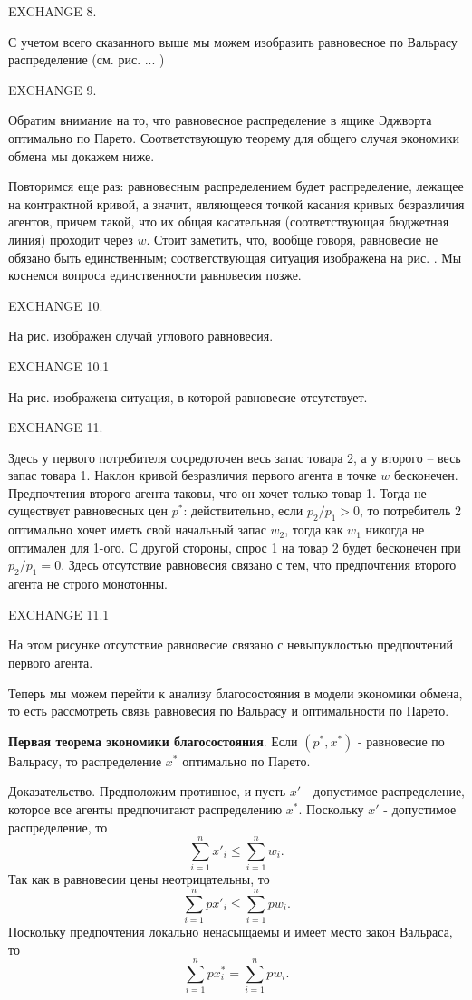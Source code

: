 EXCHANGE 8.

С учетом всего сказанного выше мы можем изобразить равновесное по
Вальрасу распределение (см. рис. ... )

EXCHANGE 9.

Обратим внимание на то, что равновесное распределение в ящике Эджворта
оптимально по Парето. Соответствующую теорему для общего случая
экономики обмена мы докажем ниже.

Повторимся еще раз: равновесным распределением будет распределение,
лежащее на контрактной кривой, а значит, являющееся точкой касания
кривых безразличия агентов, причем такой, что их общая касательная
(соответствующая бюджетная линия) проходит через $w$. Стоит заметить,
что, вообще говоря, равновесие не обязано быть единственным;
соответствующая ситуация изображена на рис.   . Мы коснемся вопроса
единственности равновесия позже.

EXCHANGE 10.

На рис.     изображен случай углового равновесия.

EXCHANGE 10.1



На рис.    изображена ситуация, в которой равновесие отсутствует.

EXCHANGE 11.

Здесь у первого потребителя сосредоточен весь запас товара 2, а у второго --
весь запас товара 1. Наклон кривой безразличия первого агента в точке $w$
бесконечен. Предпочтения второго агента таковы, что он хочет только товар 1.
Тогда не существует равновесных цен $p^*$: действительно, если $p_2/p_1>0$,
то потребитель 2 оптимально хочет иметь
свой начальный запас $w_2$, тогда как $w_1$ никогда не оптимален для 1-ого.
С другой стороны, спрос 1 на товар 2 будет бесконечен при $p_2/p_1=0$.
Здесь отсутствие равновесия связано с тем, что предпочтения второго агента
не строго монотонны.


EXCHANGE 11.1

На этом рисунке отсутствие равновесие связано с невыпуклостью предпочтений
первого агента.

Теперь мы можем перейти к анализу благосостояния в модели
экономики обмена, то есть рассмотреть связь равновесия по Вальрасу
и оптимальности по Парето.

{\bf Первая теорема экономики благосостояния}. Если $(p^*,x^*)$ - равновесие по Вальрасу, то
распределение $x^*$ оптимально по Парето.

Доказательство. Предположим противное, и пусть $x'$ - допустимое
распределение, которое все агенты предпочитают распределению $x^*$.
Поскольку $x'$ - допустимое распределение, то
$$ \sum^n_{i=1}x'_i\leq\sum^n_{i=1}w_i.$$
Так как в равновесии цены неотрицательны, то
$$ \sum^n_{i=1}px'_i\leq\sum^n_{i=1}pw_i.$$
Поскольку предпочтения локально ненасыщаемы и имеет место закон
Вальраса, то
$$ \sum^n_{i=1}px^*_i=\sum^n_{i=1}pw_i.$$

